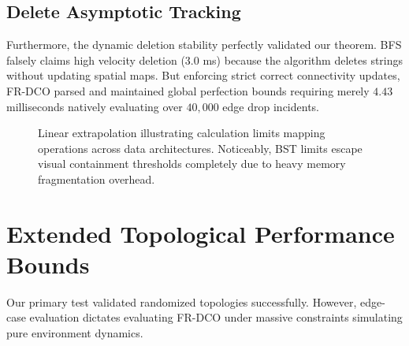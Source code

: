 \documentclass[runningheads]{llncs}
\begin{document}
\subsection{Delete Asymptotic Tracking}
Furthermore, the dynamic deletion stability perfectly validated our theorem. BFS falsely claims high velocity deletion (3.0 ms) because the algorithm deletes strings without updating spatial maps. But enforcing strict correct connectivity updates, FR-DCO parsed and maintained global perfection bounds requiring merely $4.43$ milliseconds natively evaluating over $40,000$ edge drop incidents.

\begin{figure}[htbp]
\centering
{}
\caption{Linear extrapolation illustrating calculation limits mapping operations across data architectures. Noticeably, BST limits escape visual containment thresholds completely due to heavy memory fragmentation overhead.}
\label{fig:lineplot}
\end{figure}

\section{Extended Topological Performance Bounds}

Our primary test validated randomized topologies successfully. However, edge-case evaluation dictates evaluating FR-DCO under massive constraints simulating pure environment dynamics.
\end{document}

